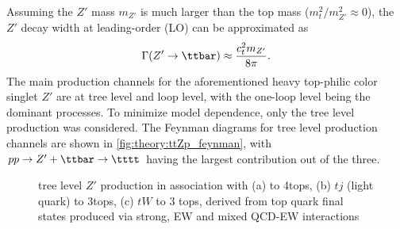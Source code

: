 \documentclass[../thesis.tex]{subfiles}
\begin{document}
Assuming the $Z'$ mass $m_{Z'}$ is much larger than the top mass ($m_t^2/m_{Z'}^2 \approx 0$), the $Z'$ decay width at leading-order (\acs{LO}) can be approximated as
\begin{equation}
\Gamma(Z' \rightarrow \ttbar) \approx \frac{c_t^2 m_{Z'}}{8\pi}.
\end{equation}
The main production channels for the aforementioned heavy top-philic color singlet $Z'$ are at tree level and loop level, with the one-loop level being the dominant processes. To minimize model dependence, only the tree level production was considered. The Feynman diagrams for tree level production channels are shown in \autoref{fig:theory:ttZp_feynman}, with $pp\rightarrow Z'+\ttbar\rightarrow\tttt$ having the largest contribution out of the three.

\begin{figure}[!htbp]
\centering
{}
\caption[Caption]{\label{fig:theory:ttZp_feynman}tree level $Z'$ production in association with (a) \ttbar to 4tops, (b) $tj$ (light quark) to 3tops, (c) $tW$ to 3 tops, derived from top quark final states produced via strong, \acs{EW} and mixed \acs{QCD}-\acs{EW} interactions \citep{theory:ttZp}}
\end{figure}

\end{document}
